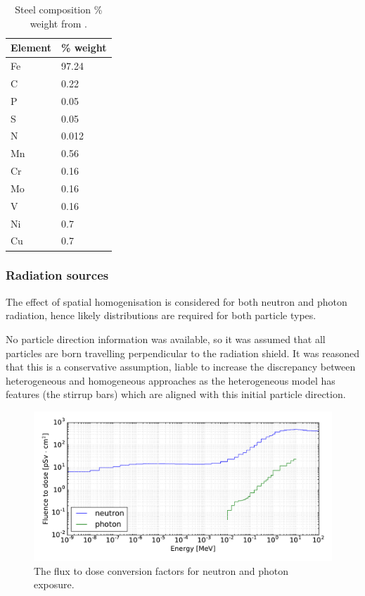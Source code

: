 \begin{table}[H]
  \centering
  \begin{tabu} to 0.3\textwidth {X X}
    \toprule
    Element & \% weight \\
    \midrule
    Fe & 97.24 \\
    C & 0.22 \\
    P & 0.05 \\
    S & 0.05 \\
    N & 0.012 \\
    Mn & 0.56 \\
    Cr & 0.16 \\
    Mo & 0.16 \\
    V & 0.16 \\
    Ni & 0.7 \\
    Cu & 0.7 \\
    \bottomrule
  \end{tabu}
  \caption{Steel composition \% weight from \cite{BSsteel05}.}
  \label{tab:steel}
\end{table}

\subsubsection{Radiation sources}
The effect of spatial homogenisation is considered for both neutron and photon radiation, hence likely distributions are required for both particle types.

No particle direction information was available, so it was assumed that all particles are born travelling perpendicular to the radiation shield. It was reasoned that this is a conservative assumption, liable to increase the discrepancy between heterogeneous and homogeneous approaches as the heterogeneous model has features (the stirrup bars) which are aligned with this initial particle direction.

\begin{figure}[H]
  \includegraphics[width=\textwidth]{icrp74}
  \caption{The flux to dose conversion factors for neutron and photon exposure.}
  \label{fig:icrp74}
\end{figure}

